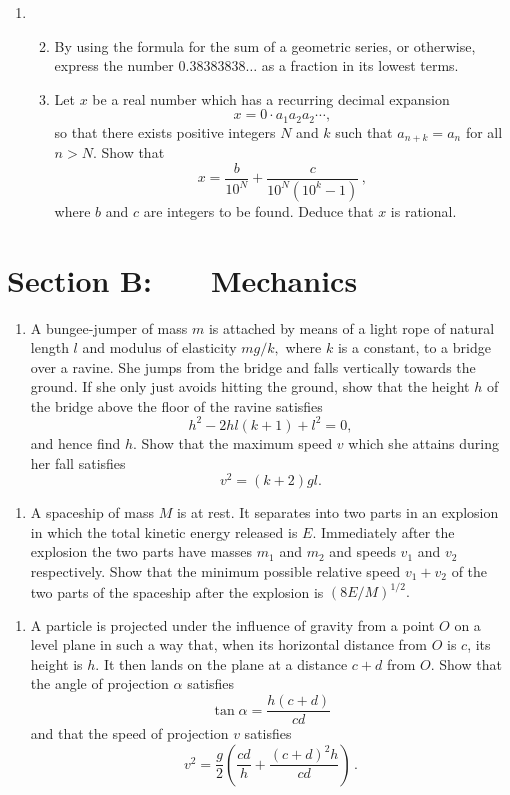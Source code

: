\documentclass[a4, 11pt]{report}
\newlength{\qspace}
\newcounter{qnumber}
\newenvironment{question}%
 {\vspace{\qspace}
  \begin{enumerate}[\bfseries 1\quad][10]%
    \setcounter{enumi}{\value{qnumber}}%
    \item%
 }
{
  \end{enumerate}
  \filbreak
  \stepcounter{qnumber}
 }
\newenvironment{questionparts}[1][1]%
 {
  \begin{enumerate}[\bfseries (i)]%
    \setcounter{enumii}{#1}
    \addtocounter{enumii}{-1}
    \setlength{\itemsep}{5mm}
    \setlength{\parskip}{8pt}
 }
 {
  \end{enumerate}
 }
\begin{document}
\begin{question}	
\begin{questionparts}
\item By using the formula for the sum of a geometric series, or
otherwise, express the number $0.38383838\ldots$ as a fraction in
its lowest terms. 
\item Let $x$ be a real number which has a recurring decimal expansion
\[
x=0\cdot a_{1}a_{2}a_{2}\cdots,
\]
so that there exists positive integers $N$ and $k$ such that $a_{n+k}=a_{n}$
for all $n>N.$ Show that 
\[
x=\frac{b}{10^{N}}+\frac{c}{10^{N}(10^{k}-1)}\,,
\]
where $b$ and $c$ are integers to be found. Deduce that $x$ is
rational. 
\end{questionparts}
\end{question}	
		

		
	
\newpage
\section*{Section B: \ \ \ Mechanics}


	
\begin{question}
A bungee-jumper of mass $m$ is attached by means of a light rope
of natural length $l$ and modulus of elasticity $mg/k,$ where $k$
is a constant, to a bridge over a ravine. She jumps from the bridge
and falls vertically towards the ground. If she only just avoids hitting
the ground, show that the height $h$ of the bridge above the floor
of the ravine satisfies 
\[
h^{2}-2hl(k+1)+l^{2}=0,
\]
and hence find $h.$ Show that the maximum speed $v$ which she attains
during her fall satisfies 
\[
v^{2}=(k+2)gl.
\]
	\end{question}
	
\begin{question}	
A spaceship of mass $M$ is at rest. It separates into two parts in
an explosion in which the total kinetic energy released is $E$. Immediately
after the explosion the two parts have masses $m_{1}$ and $m_{2}$
and speeds $v_{1}$ and $v_{2}$ respectively. Show that the minimum
possible relative speed $v_{1}+v_{2}$ of the two parts of the spaceship
after the explosion is $(8E/M)^{1/2}.$ 
\end{question}


\begin{question}
A particle is projected under the influence of gravity from a point
$O$ on a level plane in such a way that, when its horizontal distance
from $O$ is $c$, its height is $h$. It then lands on the plane
at a distance $c+d$ from $O$. Show that the angle of projection
$\alpha$ satisfies 
\[
\tan\alpha=\frac{h(c+d)}{cd}
\]
and that the speed of projection $v$ satisfies 
\[
v^{2}=\frac{g}{2}\left(\frac{cd}{h}+\frac{(c+d)^{2}h}{cd}\right)\,.
\]
\end{question}
	
\end{document}

